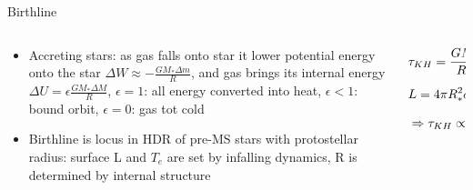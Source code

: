 \begin{frame}{Birthline}
    \begin{columns}[T]
        \begin{column}{0.6\textwidth}
    \begin{itemize}
        \item Accreting stars: as gas falls onto star it lower potential energy onto the star $\Delta W\approx -\frac{GM_*\Delta m}{R}$, and gas brings its internal energy $\Delta U=\epsilon\frac{GM_*\Delta M}{R}$, $\epsilon=1$: all energy converted into heat, $\epsilon<1$: bound orbit, $\epsilon=0$: gas tot cold
        \item Birthline is locus in HDR of pre-MS stars with protostellar radius: surface L and $T_e$ are set by infalling dynamics, R is determined by internal structure
        \end{itemize}
        \end{column}
        \begin{column}{0.4\textwidth}
            \begin{align*}
                &\tau_{KH}{}=\frac{GM_*^2}{RL}: \dot{R}_*=-n_1 \frac{R_*}{\tau_{KH}{}}\\
                &L=4\pi R_*^2\sigma T_e^4: \dot{L}_*=-n_2 \frac{L_*}{\tau_{KH}{}}\\
                &\Rightarrow\tau_{KH}{}\propto L_*^{-3/2}\tag{fixed mass}
            \end{align*}
        \end{column}
    \end{columns}
\end{frame}

